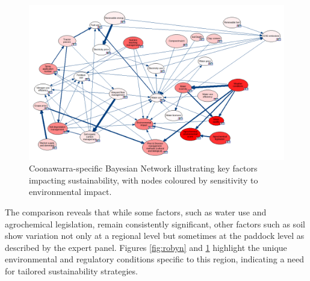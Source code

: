 \begin{figure}[h!]
    \centering
    \includegraphics[width=\linewidth]{marcel}
    \caption{Coonawarra-specific Bayesian Network illustrating key factors impacting sustainability, with nodes coloured by sensitivity to environmental impact.}\label{fig:marcel}
\end{figure}


The comparison reveals that while some factors, such as water use and agrochemical legislation, remain consistently significant, other factors such as soil show variation not only at a regional level but sometimes at the paddock level as described by the expert panel. Figures \ref{fig:robyn} and \ref{fig:marcel} highlight the unique environmental and regulatory conditions specific to this region, indicating a need for tailored sustainability strategies.

